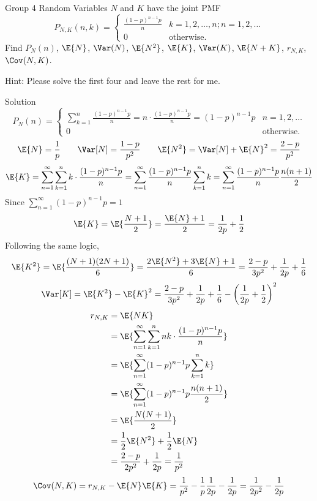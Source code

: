 \documentclass{article}
\theoremstyle{plain}
\theoremstyle{definition}
\theoremstyle{remark}
\begin{document}
\begin{problem}
    {Group 4}
    Random Variables $N$ and $K$ have the joint PMF
    \[
    P_{N,K}(n,k)={
        \begin{cases}
            \frac{(1-p)^{n-1}p}{n} & k=1,2,\ldots,n; n=1,2,\ldots\\
            0 & \text{otherwise.}
        \end{cases}
    }
    \]
    Find $P_N(n)$, $\E{N}$, $\Var(N)$, $\E{N^2}$, $\E{K}$, $\Var(K)$, $\E{N+K}$, $r_{N,K}$, $\Cov(N,K)$.
    \begin{solution}
        {Hint:}
        Please solve the first four and leave the rest for me.
    \end{solution}
\end{problem}

\begin{solution}
    {Solution}
    \[
    P_N(n)={
        \begin{cases}
            \sum_{k=1}^{n}\frac{(1-p)^{n-1}p}{n}=n\cdot\frac{(1-p)^{n-1}p}{n}=(1-p)^{n-1}p & n=1,2,\ldots\\
            0 & \text{otherwise.}
        \end{cases}
    }
    \]
    \[
    \E{N} = \frac{1}{p} \qquad \Var[N] = \frac{1-p}{p^2} \qquad \E{N^2} = \Var[N] + \E{N}^2 = \frac{2-p}{p^2}
    \]
    \[
    \E{K} = \sum_{n=1}^{\infty}\sum_{k=1}^{n}k\cdot\frac{(1-p)^{n-1}p}{n} = \sum_{n=1}^{\infty}\frac{(1-p)^{n-1}p}{n}\sum_{k=1}^{n}k = \sum_{n=1}^{\infty}\frac{(1-p)^{n-1}p}{n}\frac{n(n+1)}{2}
    \]
    Since $\sum_{n=1}^{\infty}(1-p)^{n-1}p=1$
    \[
        \E{K} = \E{\frac{N+1}{2}} = \frac{\E{N}+1}{2} = \frac{1}{2p}+\frac{1}{2}
    \]
    Following the same logic,
    \[
    \E{K^2} = \E{\frac{(N+1)(2N+1)}{6}}=\frac{2\E{N^2}+3\E{N}+1}{6}= \frac{2-p}{3p^2}+\frac{1}{2p}+\frac{1}{6}
    \]
    \[
    \Var[K] = \E{K^2}-\E{K}^2 = \frac{2-p}{3p^2}+\frac{1}{2p}+\frac{1}{6}-\left(\frac{1}{2p}+\frac{1}{2}\right)^2
    \]
    \begin{align*}
        r_{N,K}
        &= \E{NK} \\
        &= \E{\sum_{n=1}^{\infty}\sum_{k=1}^{n}nk\cdot\frac{(1-p)^{n-1}p}{n}} \\
        &= \E{\sum_{n=1}^{\infty}(1-p)^{n-1}p\sum_{k=1}^{n}k} \\
        &= \E{\sum_{n=1}^{\infty}(1-p)^{n-1}p\frac{n(n+1)}{2}} \\
        &= \E{\frac{N(N+1)}{2}} \\
        &= \frac{1}{2}\E{N^2}+\frac{1}{2}\E{N} \\
        &= \frac{2-p}{2p^2}+\frac{1}{2p} = \frac{1}{p^2}
    \end{align*}
    \[
    \Cov(N,K) = r_{N,K}-\E{N}\E{K} = \frac{1}{p^2}-\frac{1}{p}\frac{1}{2p}-\frac{1}{2p} = \frac{1}{2p^2}-\frac{1}{2p}
    \]
\end{solution}
\end{document}
